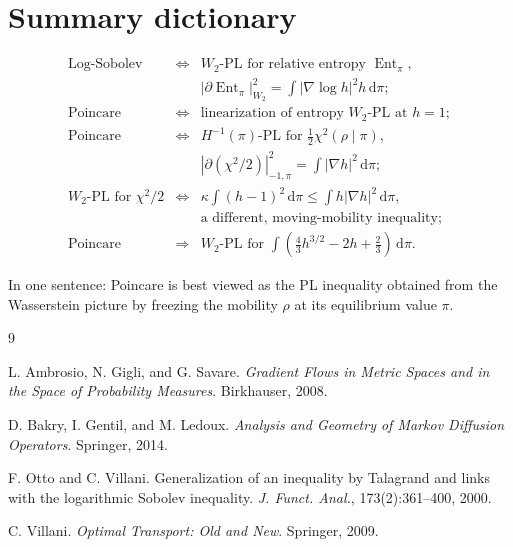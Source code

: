 \documentclass[11pt]{article}
\DeclareMathOperator{\Ent}{Ent}
\newcommand{\dd}{\,\mathrm d}
\begin{document}
\section{Summary dictionary}

\[
\begin{array}{ccl}
\text{Log-Sobolev} 
&\Longleftrightarrow&
W_2\text{-PL for relative entropy }\Ent_\pi, \\
&& |\partial\Ent_\pi|_{W_2}^2=\displaystyle\int |\nabla\log h|^2h\dd\pi; \\
\text{Poincare}
&\Longleftrightarrow&
\text{linearization of entropy }W_2\text{-PL at }h=1;\\
\text{Poincare}
&\Longleftrightarrow&
H^{-1}(\pi)\text{-PL for }\displaystyle\frac12\chi^2(\rho\mid\pi),\\
&& |\partial(\chi^2/2)|_{-1,\pi}^2=\displaystyle\int |\nabla h|^2\dd\pi;\\
W_2\text{-PL for }\chi^2/2
&\Longleftrightarrow&
\displaystyle \kappa\int(h-1)^2\dd\pi\le \int h|\nabla h|^2\dd\pi,\\
&& \text{a different, moving-mobility inequality;}\\
\text{Poincare}
&\Longrightarrow&
W_2\text{-PL for }\displaystyle\int\left(\frac43h^{3/2}-2h+\frac23\right)\dd\pi.
\end{array}
\]

In one sentence: Poincare is best viewed as the PL inequality obtained from the Wasserstein picture by freezing the mobility $\rho$ at its equilibrium value $\pi$.

\begin{thebibliography}{9}

L. Ambrosio, N. Gigli, and G. Savare.
\newblock \emph{Gradient Flows in Metric Spaces and in the Space of Probability Measures}.
\newblock Birkhauser, 2008.

D. Bakry, I. Gentil, and M. Ledoux.
\newblock \emph{Analysis and Geometry of Markov Diffusion Operators}.
\newblock Springer, 2014.

F. Otto and C. Villani.
\newblock Generalization of an inequality by Talagrand and links with the logarithmic Sobolev inequality.
\newblock \emph{J. Funct. Anal.}, 173(2):361--400, 2000.

C. Villani.
\newblock \emph{Optimal Transport: Old and New}.
\newblock Springer, 2009.

\end{thebibliography}
\end{document}
